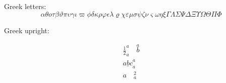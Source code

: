 \documentclass[11pt, oneside]{article}   	%
\begin{document}
Greek letters:
\begin{equation}
 \alpha \theta o \tau \beta \vartheta \pi \upsilon \gamma \iota \varpi \phi \delta \kappa \rho \varphi \epsilon \lambda \varrho \chi \varepsilon \mu \sigma \psi \zeta \nu \varsigma \omega \eta \xi \Gamma \Lambda \Sigma \Psi \Delta \Xi \Upsilon \Omega \Theta \Pi \Phi
\end{equation}

Greek upright:
\begin{equation}
\end{equation}


\begin{eqnarray}
  \frac{1}{2}_a^a \quad \stackrel{a}{b} \\
  \underline{abc}_a^a \\
  \boxed{a\quad^2_a}
\end{eqnarray}
\end{document}
